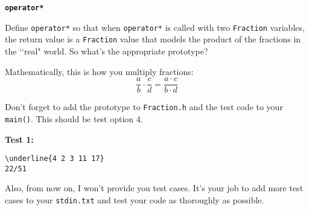 \texttt{\bf operator*}

Define \verb!operator*! so that when \verb!operator*! is called with two
\verb!Fraction! variables, the return value is a \verb!Fraction! value that
models the product of the fractions in the \lq\lq real" world. So what's the
appropriate prototype?

Mathematically, this is how you multiply fractions:
\[
\frac{a}{b} \cdot
\frac{c}{d} =
\frac{a \cdot c}{b \cdot d}
\]

Don't forget to add the prototype to \verb!Fraction.h! and the test code to
your \verb!main()!. This should be test option 4.

\textbf{Test 1:}
\begin{Verbatim}[frame=single, commandchars=\\\{\}]
\underline{4 2 3 11 17}
22/51
\end{Verbatim}

Also, from now on, I won't provide you test cases. It's your job to add more
test cases to your \verb!stdin.txt! and test your code as thoroughly as
possible.
